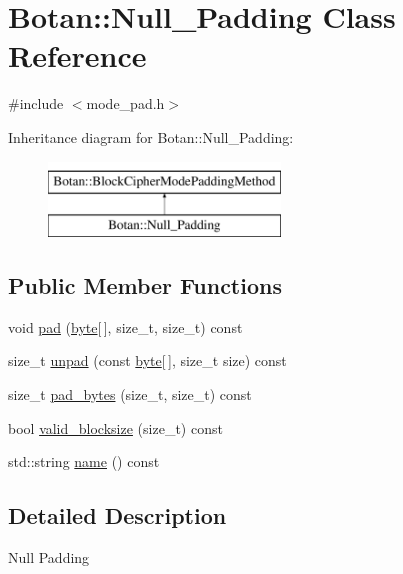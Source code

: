 \hypertarget{classBotan_1_1Null__Padding}{\section{Botan\-:\-:Null\-\_\-\-Padding Class Reference}
\label{classBotan_1_1Null__Padding}
}


{\ttfamily \#include $<$mode\-\_\-pad.\-h$>$}

Inheritance diagram for Botan\-:\-:Null\-\_\-\-Padding\-:\begin{figure}[H]
\begin{center}
\leavevmode
\includegraphics[height=2.000000cm]{classBotan_1_1Null__Padding}
\end{center}
\end{figure}
\subsection*{Public Member Functions}
\begin{DoxyCompactItemize}
\item 
void \hyperlink{classBotan_1_1Null__Padding_a7dbe23f5d16e0737e02e301e00061821}{pad} (\hyperlink{namespaceBotan_a7d793989d801281df48c6b19616b8b84}{byte}\mbox{[}$\,$\mbox{]}, size\-\_\-t, size\-\_\-t) const 
\item 
size\-\_\-t \hyperlink{classBotan_1_1Null__Padding_a1e02c97a519f59f1dc5c295649017990}{unpad} (const \hyperlink{namespaceBotan_a7d793989d801281df48c6b19616b8b84}{byte}\mbox{[}$\,$\mbox{]}, size\-\_\-t size) const 
\item 
size\-\_\-t \hyperlink{classBotan_1_1Null__Padding_a0b29ec2dbeede72b5c900ee667d95351}{pad\-\_\-bytes} (size\-\_\-t, size\-\_\-t) const 
\item 
bool \hyperlink{classBotan_1_1Null__Padding_a505dde7ac78f9f2d24722285516d4525}{valid\-\_\-blocksize} (size\-\_\-t) const 
\item 
std\-::string \hyperlink{classBotan_1_1Null__Padding_af18964ec88ce0236f4eebf565fe887ea}{name} () const 
\end{DoxyCompactItemize}


\subsection{Detailed Description}
Null Padding 

